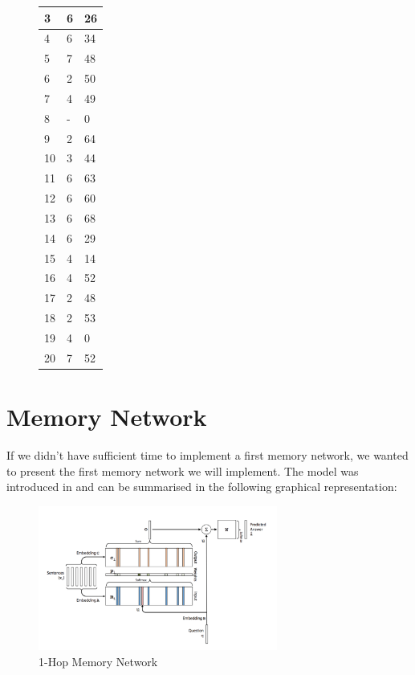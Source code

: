 \documentclass[paper=a4, fontsize=11pt]{scrartcl} %
\numberwithin{equation}{section} %
\numberwithin{figure}{section} %
\numberwithin{table}{section} %
\begin{document}
\begin{figure}[H]
\begin{minipage}{.5\textwidth}
\begin{tabular}{|l|l|l|}
3    & 6                   & 26       \\ \hline
4    & 6                   & 34       \\ \hline
5    & 7                   & 48       \\ \hline
6    & 2                   & 50       \\ \hline
7    & 4                   & 49       \\ \hline
8    & -                   & 0        \\ \hline
9    & 2                   & 64       \\ \hline
10   & 3                   & 44       \\ \hline
11   & 6                   & 63       \\ \hline
12   & 6                   & 60       \\ \hline
13   & 6                   & 68       \\ \hline
14   & 6                   & 29       \\ \hline
15   & 4                   & 14       \\ \hline
16   & 4                   & 52       \\ \hline
17   & 2                   & 48       \\ \hline
18   & 2                   & 53       \\ \hline
19   & 4                   & 0        \\ \hline
20   & 7                   & 52       \\ \hline
\end{tabular}
\end{minipage}
\end{figure}

\section{Memory Network}

If we didn't have sufficient time to implement a first memory network, we wanted to present the first memory network we will implement. The model was introduced in \cite{mem} and can be summarised in the following graphical representation:

\begin{figure}[H]
\begin{center}
    \includegraphics[width=0.7\textwidth]{mem.png}
    \caption{1-Hop Memory Network}
\end{center}
\end{figure}
\end{document}
